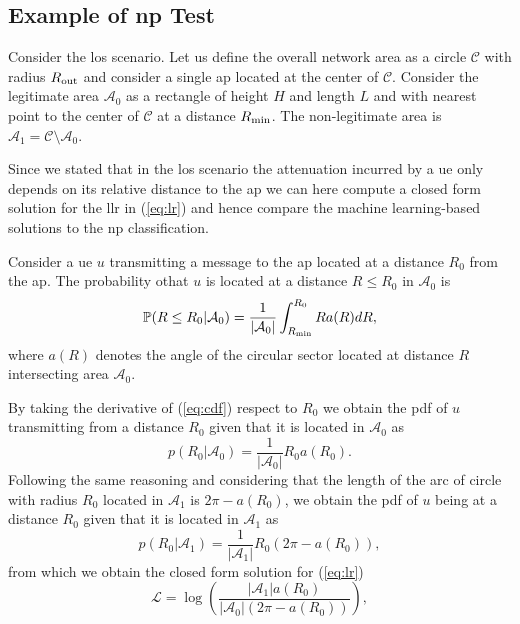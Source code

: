 \documentclass[draftcls,onecolumn,12pt]{IEEEtran}
\begin{document}
\subsection{Example of \ac{np} Test}\label{sec:los}
Consider the \ac{los} scenario. Let us define the overall network area as a circle $\mathcal{C}$ with radius $R_{\rm out}$ and consider a single \ac{ap} located at the center of $\mathcal{C}$. Consider the legitimate area $\mathcal{A}_{0}$ as a rectangle of height $H$ and length $L$ and with nearest point to the center of $\mathcal{C}$ at a distance $R_{\rm min}$. The non-legitimate area is $\mathcal{A}_1 = \mathcal{C} \setminus \mathcal{A}_0$.

Since we stated that in the \ac{los} scenario the attenuation incurred by a \ac{ue} only depends on its relative distance to the \ac{ap} we can here compute a closed form solution for the \ac{llr} in (\ref{eq:lr}) and hence compare the machine learning-based solutions to the \ac{np} classification.

Consider a \ac{ue} $u$ transmitting a message to the \ac{ap} located at a distance $R_0$ from the \ac{ap}. The probability othat $u$ is located at a distance $R\le R_0$ in $\mathcal{A}_0$ is
\begin{equation}\label{eq:cdf}
     \mathbb{P}(R \le R_0|\mathcal{A}_0) = \frac{1}{|\mathcal{A}_0|}\int_{R_{\rm min}}^{R_0} R a(R) dR,
\end{equation}
where $a(R)$ denotes the angle of the circular sector located at distance $R$ intersecting area $\mathcal{A}_0$.

By taking the derivative of (\ref{eq:cdf}) respect to $R_0$ we obtain the \ac{pdf} of $u$ transmitting from a distance $R_0$ given that it is located in $\mathcal{A}_0$ as
\begin{equation}
    p(R_0|\mathcal{A}_0) = \frac{1}{|\mathcal{A}_0|}R_0a(R_0).
\end{equation}
Following the same reasoning and considering that the length of the arc of circle with radius $R_0$ located in $\mathcal{A}_1$ is $2\pi - a(R_0)$, we obtain the \ac{pdf} of $u$ being at a distance $R_0$ given that it is located in $\mathcal{A}_1$ as
\begin{equation}
     p(R_0|\mathcal{A}_1) = \frac{1}{|\mathcal{A}_1|}R_0\left(2\pi-a(R_0)\right),
\end{equation}
from which we obtain the closed form solution for (\ref{eq:lr}) 
\begin{equation}
    \mathcal{L}=\log\left(\frac{|\mathcal{A}_1|a(R_0)}{|\mathcal{A}_0|\left(2\pi-a(R_0)\right)}\right),
\end{equation}
\end{document}

